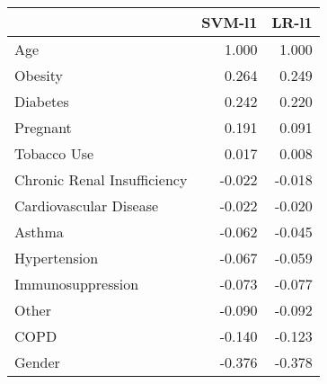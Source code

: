 \begin{tabular}{lrr}
\toprule
{} &  SVM-l1 &  LR-l1 \\
\midrule
Age                         &   1.000 &  1.000 \\
Obesity                     &   0.264 &  0.249 \\
Diabetes                    &   0.242 &  0.220 \\
Pregnant                    &   0.191 &  0.091 \\
Tobacco Use                 &   0.017 &  0.008 \\
Chronic Renal Insufficiency &  -0.022 & -0.018 \\
Cardiovascular Disease      &  -0.022 & -0.020 \\
Asthma                      &  -0.062 & -0.045 \\
Hypertension                &  -0.067 & -0.059 \\
Immunosuppression           &  -0.073 & -0.077 \\
Other                       &  -0.090 & -0.092 \\
COPD                        &  -0.140 & -0.123 \\
Gender                      &  -0.376 & -0.378 \\
\bottomrule
\end{tabular}
